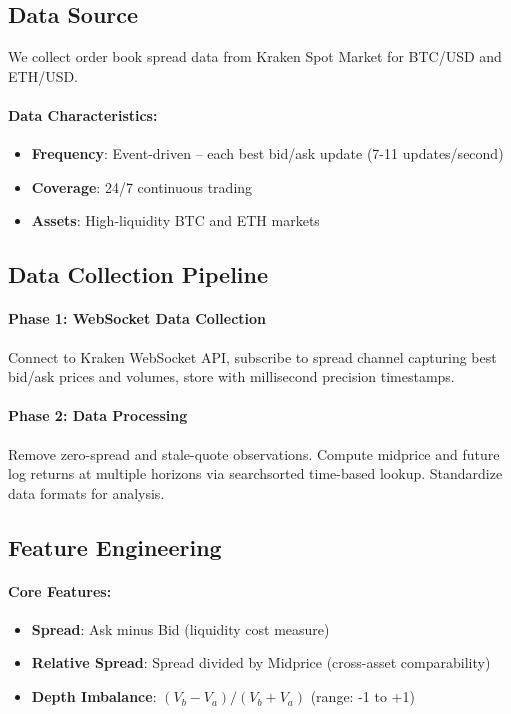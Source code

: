 \documentclass[12pt,a4paper]{article}
\begin{document}
\subsection{Data Source}

We collect order book spread data from Kraken Spot Market for BTC/USD and ETH/USD.

\paragraph{Data Characteristics:}
\begin{itemize}
    \item \textbf{Frequency}: Event-driven -- each best bid/ask update (7-11 updates/second)
    \item \textbf{Coverage}: 24/7 continuous trading
    \item \textbf{Assets}: High-liquidity BTC and ETH markets
\end{itemize}

\subsection{Data Collection Pipeline}

\paragraph{Phase 1: WebSocket Data Collection}
Connect to Kraken WebSocket API, subscribe to spread channel capturing best bid/ask prices and volumes, store with millisecond precision timestamps.

\paragraph{Phase 2: Data Processing}
Remove zero-spread and stale-quote observations. Compute midprice and future log returns at multiple horizons via searchsorted time-based lookup. Standardize data formats for analysis.

\subsection{Feature Engineering}

\paragraph{Core Features:}
\begin{itemize}
    \item \textbf{Spread}: Ask minus Bid (liquidity cost measure)
    \item \textbf{Relative Spread}: Spread divided by Midprice (cross-asset comparability)
    \item \textbf{Depth Imbalance}: $(V_b - V_a) / (V_b + V_a)$ (range: -1 to +1)
\end{itemize}
\end{document}
